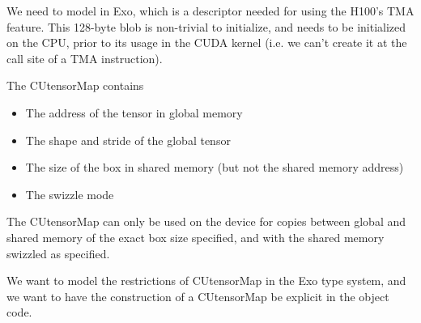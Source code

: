 




We need to model  in Exo, which is a descriptor needed for using the H100's TMA feature.
This 128-byte blob is non-trivial to initialize, and needs to be initialized on the CPU, prior to its usage in the CUDA kernel
(i.e. we can't create it at the call site of a TMA instruction).

The CUtensorMap contains
\begin{itemize}
  \item The address of the tensor in global memory
  \item The shape and stride of the global tensor
  \item The size of the box in shared memory (but not the shared memory address)
  \item The swizzle mode
\end{itemize}

The CUtensorMap can only be used on the device for copies between global and shared memory of the exact box size specified, and with the shared memory swizzled as specified.

We want to model the restrictions of CUtensorMap in the Exo type system, and we want to have the construction of a CUtensorMap be explicit in the object code.

